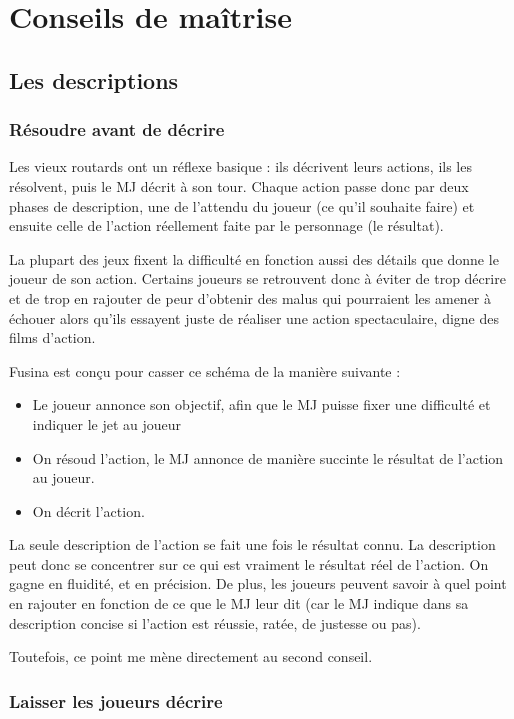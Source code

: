\part{Conseils de maîtrise}

\chapter{Les descriptions}

\section{Résoudre avant de décrire}

Les vieux routards ont un réflexe basique : ils décrivent leurs actions, ils les résolvent, puis le MJ décrit à son tour. Chaque action passe donc par deux phases de description, une de l'attendu du joueur (ce qu'il souhaite faire) et ensuite celle de l'action réellement faite par le personnage (le résultat). 

La plupart des jeux fixent la difficulté en fonction aussi des détails que donne le joueur de son action. Certains joueurs se retrouvent donc à éviter de trop décrire et de trop en rajouter de peur d'obtenir des malus qui pourraient les amener à échouer alors qu'ils essayent juste de réaliser une action spectaculaire, digne des films d'action.

Fusina est conçu pour casser ce schéma de la manière suivante :

\begin{itemize}
\item Le joueur annonce son objectif, afin que le MJ puisse fixer une difficulté et indiquer le jet au joueur
\item On résoud l'action, le MJ annonce de manière succinte le résultat de l'action au joueur.
\item On décrit l'action.
\end{itemize}

La seule description de l'action se fait une fois le résultat connu. La description peut donc se concentrer sur ce qui est vraiment le résultat réel de l'action. On gagne en fluidité, et en précision. De plus, les joueurs peuvent savoir à quel point en rajouter en fonction de ce que le MJ leur dit (car le MJ indique dans sa description concise si l'action est réussie, ratée, de justesse ou pas).

Toutefois, ce point me mène directement au second conseil.

\section{Laisser les joueurs décrire}

